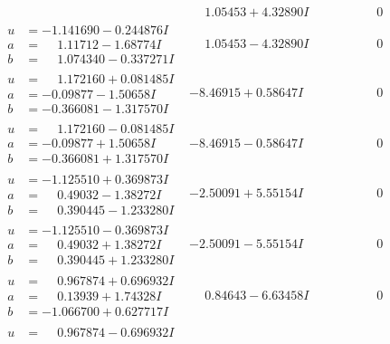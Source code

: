 \documentclass[1p]{elsarticle_modified}
\theoremstyle{definition}
\begin{document}
$$\begin{array}{c|c|c}
 & \phantom{-}1.05453 + 4.32890 I & \phantom{-0.000000 } 0 \\ \hline\begin{aligned}
u &= -1.141690 - 0.244876 I \\
a &= \phantom{-}1.11712 - 1.68774 I \\
b &= \phantom{-}1.074340 - 0.337271 I\end{aligned}
 & \phantom{-}1.05453 - 4.32890 I & \phantom{-0.000000 } 0 \\ \hline\begin{aligned}
u &= \phantom{-}1.172160 + 0.081485 I \\
a &= -0.09877 - 1.50658 I \\
b &= -0.366081 - 1.317570 I\end{aligned}
 & -8.46915 + 0.58647 I & \phantom{-0.000000 } 0 \\ \hline\begin{aligned}
u &= \phantom{-}1.172160 - 0.081485 I \\
a &= -0.09877 + 1.50658 I \\
b &= -0.366081 + 1.317570 I\end{aligned}
 & -8.46915 - 0.58647 I & \phantom{-0.000000 } 0 \\ \hline\begin{aligned}
u &= -1.125510 + 0.369873 I \\
a &= \phantom{-}0.49032 - 1.38272 I \\
b &= \phantom{-}0.390445 - 1.233280 I\end{aligned}
 & -2.50091 + 5.55154 I & \phantom{-0.000000 } 0 \\ \hline\begin{aligned}
u &= -1.125510 - 0.369873 I \\
a &= \phantom{-}0.49032 + 1.38272 I \\
b &= \phantom{-}0.390445 + 1.233280 I\end{aligned}
 & -2.50091 - 5.55154 I & \phantom{-0.000000 } 0 \\ \hline\begin{aligned}
u &= \phantom{-}0.967874 + 0.696932 I \\
a &= \phantom{-}0.13939 + 1.74328 I \\
b &= -1.066700 + 0.627717 I\end{aligned}
 & \phantom{-}0.84643 - 6.63458 I & \phantom{-0.000000 } 0 \\ \hline\begin{aligned}
u &= \phantom{-}0.967874 - 0.696932 I \\

\end{aligned}
\end{array}$$
\end{document}
